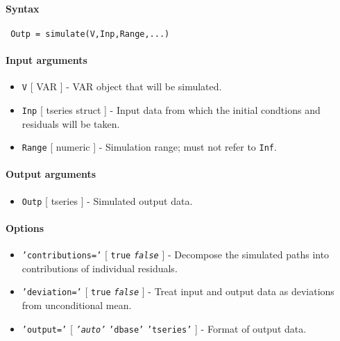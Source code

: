 


	\paragraph{Syntax}
 
 \begin{verbatim}
 Outp = simulate(V,Inp,Range,...)
 \end{verbatim}
 
 \paragraph{Input arguments}
 
 \begin{itemize}
 \item
   \texttt{V} {[} VAR {]} - VAR object that will be simulated.
 \item
   \texttt{Inp} {[} tseries \textbar{} struct {]} - Input data from which
   the initial condtions and residuals will be taken.
 \item
   \texttt{Range} {[} numeric {]} - Simulation range; must not refer to
   \texttt{Inf}.
 \end{itemize}
 
 \paragraph{Output arguments}
 
 \begin{itemize}
 \item
   \texttt{Outp} {[} tseries {]} - Simulated output data.
 \end{itemize}
 
 \paragraph{Options}
 
 \begin{itemize}
 \item
   \texttt{'contributions='} {[} \texttt{true} \textbar{}
   \emph{\texttt{false}} {]} - Decompose the simulated paths into
   contributions of individual residuals.
 \item
   \texttt{'deviation='} {[} \texttt{true} \textbar{}
   \emph{\texttt{false}} {]} - Treat input and output data as deviations
   from unconditional mean.
 \item
   \texttt{'output='} {[} \emph{\texttt{'auto'}} \textbar{}
   \texttt{'dbase'} \textbar{} \texttt{'tseries'} {]} - Format of output
   data.
 \end{itemize}
 
